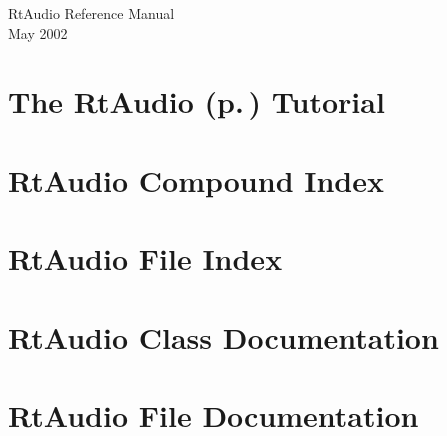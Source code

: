 \documentclass[letterpaper]{book}
\begin{document}
\begin{titlepage}
\vspace*{7cm}
\begin{center}
{\Large Rt\-Audio Reference Manual}\\
\vspace*{1cm}
{\small May 2002}\\
\end{center}
\end{titlepage}
\clearemptydoublepage
{}
\tableofcontents
\clearemptydoublepage
{}
\chapter{The {\bf Rt\-Audio} {\rm (p.\,\pageref{classRtAudio})} Tutorial}
\label{index}
\chapter{Rt\-Audio Compound Index}

\chapter{Rt\-Audio File Index}

\chapter{Rt\-Audio Class Documentation}



\chapter{Rt\-Audio File Documentation}


\printindex
\end{document}
